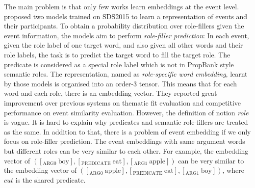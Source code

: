 \documentclass[a4paper]{article}
\begin{document}
The main problem is that only few works learn embeddings at the event level. \citet{tilk2016event} proposed two models trained on SDS2015 to learn a representation of events and their participants. To obtain a probability distribution over role-fillers given the event information, the models aim to perform \textit{role-filler prediction}: In each event, given the role label of one target word, and also given all other words and their role labels, the task is to predict the target word to fill the target role. The predicate is considered as a special role label which is not in PropBank style semantic roles. The representation, named as \textit{role-specific word embedding}, learnt by those models is organised into an order-3 tensor. This means that for each word and each role, there is an embedding vector. They reported great improvement over previous systems on thematic fit evaluation and competitive performance on event similarity evaluation. However, the definition of notion \textit{role} is vague. It is hard to explain why predicates and semantic role-fillers are treated as the same. In addition to that, there is a problem of event embedding if we only focus on role-filler prediction. The event embeddings with same argument words but different roles can be very similar to each other. For example, the embedding vector of $([_\text{ARG0 }\text{boy}], [_\text{PREDICATE }\text{eat}], [_\text{ARG1 }\text{apple}])$ can be very similar to the embedding vector of $([_\text{ARG0 }\text{apple}], [_\text{PREDICATE }\text{eat}], [_\text{ARG1 }\text{boy}])$, where $cut$ is the shared predicate. 
\end{document}
